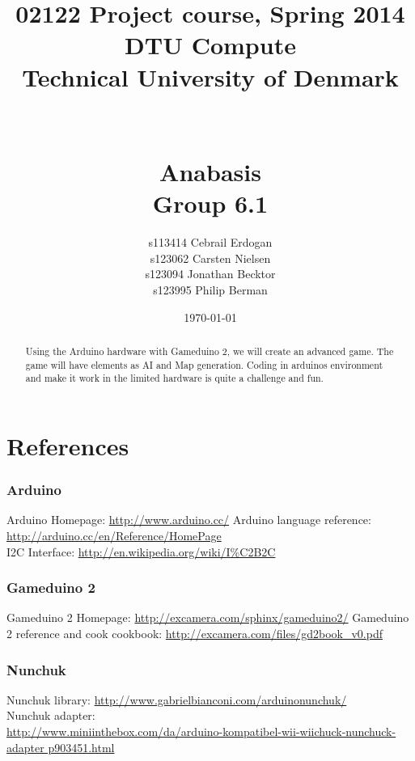 \documentclass[12pt]{report}
\title{02122 Project course, Spring 2014 \\
DTU Compute \\
Technical University of Denmark \\~\\~\\ Anabasis \\ Group 6.1}
\author{s113414 Cebrail Erdogan \\
        s123062 Carsten Nielsen \\
        s123094 Jonathan Becktor\\
        s123995 Philip Berman   \\  }
\date{\today}
\begin{document}
\pagestyle{headings}



\maketitle

\begin{abstract}
Using the Arduino hardware with Gameduino 2, we will create an advanced game.
The game will have elements as AI and Map generation.
Coding in arduinos environment and make it work in the
limited hardware is quite a challenge and fun.
\end{abstract}


\tableofcontents

\newpage



\newpage

















\chapter{References}

\subsection*{Arduino}
Arduino Homepage: \url{http://www.arduino.cc/}
Arduino language reference: \url{http://arduino.cc/en/Reference/HomePage}\\
I2C Interface: \url{http://en.wikipedia.org/wiki/I%C2B2C}

\subsection*{Gameduino 2}
Gameduino 2 Homepage: \url{http://excamera.com/sphinx/gameduino2/}
Gameduino 2 reference and cook cookbook: \url{http://excamera.com/files/gd2book_v0.pdf}


\subsection*{Nunchuk}
Nunchuk library: \url{http://www.gabrielbianconi.com/arduinonunchuk/} \\
Nunchuk adapter: \\ \url{http://www.miniinthebox.com/da/arduino-kompatibel-wii-wiichuck-nunchuck-adapter p903451.html}
\end{document}
